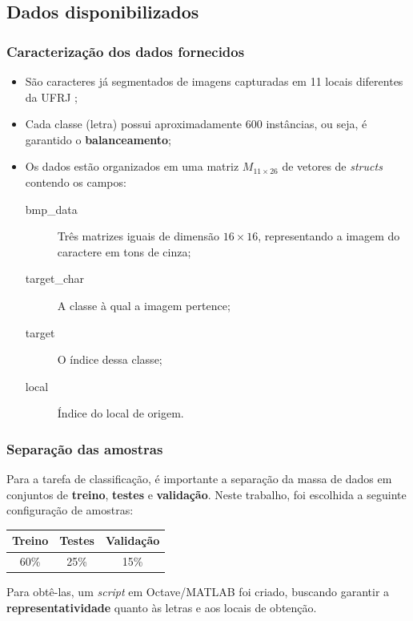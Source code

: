\subsection[Subsection]{Dados disponibilizados}
\begin{frame}
	\frametitle{Caracterização dos dados fornecidos}
	\begin{itemize}
		\item São caracteres já segmentados de imagens capturadas em 11 locais diferentes da UFRJ
			\cite{Allan};
		\item Cada classe (letra) possui aproximadamente 600 instâncias, ou seja,
			é garantido o \textbf{balanceamento};
		\item Os dados estão organizados
			em uma matriz $M_{11 \times 26}$ de vetores de \emph{structs} contendo os campos:
		\begin{description}
			\item [bmp\_data] Três matrizes iguais de dimensão $16 \times 16$, 
			representando a imagem do caractere  em tons de cinza;
			\item [target\_char] A classe à qual a imagem pertence;
			\item [target] O índice dessa classe;
			\item [local] Índice do local de origem. 
		\end{description}


	\end{itemize}
\end{frame}
\begin{frame}
	\frametitle{Separação das amostras}

	Para a tarefa de classificação, é importante a separação da massa de dados em 
	conjuntos de \textbf{treino}, \textbf{testes} e \textbf{validação}. Neste trabalho, foi
	escolhida a seguinte configuração de amostras: 

	\begin{table}[H]
	\centering
	\label{t:amostras}
		\begin{tabular}{c|c|c}
		Treino & Testes & Validação\\
		\hline
		60\% & 25\% & 15\%\\
		\end{tabular}
	\end{table}

	Para obtê-las, um \emph{script} em Octave/MATLAB foi criado,
	buscando garantir a \textbf{representatividade} quanto às letras
	e aos locais de obtenção.
\end{frame}

